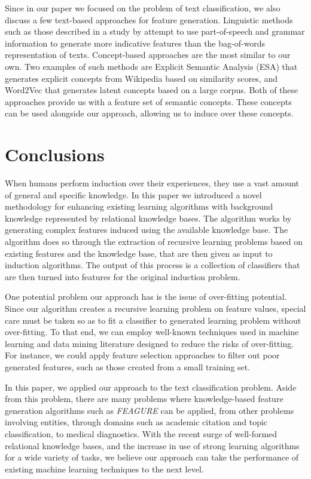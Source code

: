 \documentclass[twoside,11pt]{article}
\theoremstyle{definition}
\begin{document}
Since in our paper we focused on the problem of text classification, we also discuss a few text-based approaches for feature generation. 
Linguistic methods such as those described in a study by  attempt to use part-of-speech and grammar information to generate more indicative features than the bag-of-words representation of texts.
Concept-based approaches are the most similar to our own. Two examples of such methods are Explicit Semantic Analysis (ESA) \cite{gabrilovich2009wikipediafull} that generates explicit concepts from Wikipedia based on similarity scores, and Word2Vec  that generates latent concepts based on a large corpus. Both of these approaches provide us with a feature set of semantic concepts. These concepts can be used alongside our approach, allowing us to induce over these concepts.

\section{Conclusions}

When humans perform induction over their experiences, they use a vast amount of general and specific knowledge. In this paper we introduced a novel methodology for enhancing existing learning algorithms with background knowledge represented by relational knowledge bases.
The algorithm works by generating complex features induced using the available knowledge base. The algorithm does so through the extraction of recursive learning problems based on existing features and the knowledge base, that are then given as input to induction algorithms. The output of this process is a collection of classifiers that are then turned into features for the original induction problem.

One potential problem our approach has is the issue of over-fitting potential. Since our algorithm creates a recursive learning problem on feature values, special care must be taken so as to fit a classifier to generated learning problem without over-fitting. To that end, we can employ well-known techniques used in machine learning and data mining literature designed to reduce the risks of over-fitting. For instance, we could apply feature selection approaches to filter out poor generated features, such as those created from a small training set.

In this paper, we applied our approach to the text classification problem. Aside from this problem, there are many problems where knowledge-based feature generation algorithms such as \emph{FEAGURE} can be applied, from other problems involving entities, through domains such as academic citation and topic classification, to medical diagnostics.
With the recent surge of well-formed relational knowledge bases,
and the increase in use of strong learning algorithms for a wide variety of tasks,
we believe our approach can take the performance of existing machine learning techniques to the next level.

\clearpage
\vskip 0.2in


\end{document}
